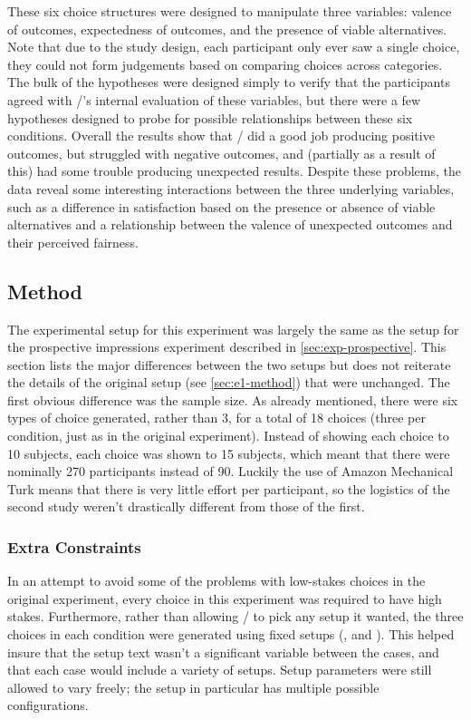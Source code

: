 These six choice structures were designed to manipulate three variables: valence of outcomes, expectedness of outcomes, and the presence of viable alternatives.
%
Note that due to the study design, each participant only ever saw a single choice, they could not form judgements based on comparing choices across categories.
%
The bulk of the hypotheses were designed simply to verify that the participants agreed with \dunyazad/'s internal evaluation of these variables, but there were a few hypotheses designed to probe for possible relationships between these six conditions.
%
Overall the results show that \dunyazad/ did a good job producing positive outcomes, but struggled with negative outcomes, and (partially as a result of this) had some trouble producing unexpected results.
%
Despite these problems, the data reveal some interesting interactions between the three underlying variables, such as a difference in satisfaction based on the presence or absence of viable alternatives and a relationship between the valence of unexpected outcomes and their perceived fairness.


\subsection{Method}

The experimental setup for this experiment was largely the same as the setup for the prospective impressions experiment described in \cref{sec:exp-prospective}.
%
This section lists the major differences between the two setups but does not reiterate the details of the original setup (see \cref{sec:e1-method}) that were unchanged.
%
The first obvious difference was the sample size.
%
As already mentioned, there were six types of choice generated, rather than 3, for a total of 18 choices (three per condition, just as in the original experiment).
%
Instead of showing each choice to 10 subjects, each choice was shown to 15 subjects, which meant that there were nominally 270 participants instead of 90.
%
Luckily the use of Amazon Mechanical Turk means that there is very little effort per participant, so the logistics of the second study weren't drastically different from those of the first.


\subsubsection{Extra Constraints}

In an attempt to avoid some of the problems with low-stakes choices in the original experiment, every choice in this experiment was required to have high stakes.
%
Furthermore, rather than allowing \dunyazad/ to pick any setup it wanted, the three choices in each condition were generated using fixed setups (,  and ).
%
This helped insure that the setup text wasn't a significant variable between the cases, and that each case would include a variety of setups.
%
Setup parameters were still allowed to vary freely; the  setup in particular has multiple possible configurations.


